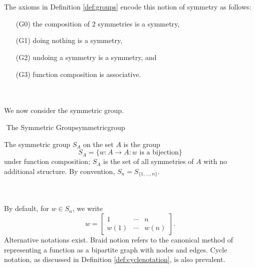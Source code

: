     \pagebreak
    \vphantom
    \\
    \\
    The axioms in Definition \ref{def:groups} encode this notion of symmetry as follows:
    \begin{enumerate}
        \item[(G0)] the composition of \(2\) symmetries is a symmetry,
        \item[(G1)] doing nothing is a symmetry,
        \item[(G2)] undoing a symmetry is a symmetry, and
        \item[(G3)] function composition is associative. 
    \end{enumerate}
    \vphantom
    \\
    \\
    We now consider the symmetric group.
    \begin{definition}{\Stop\,\,The Symmetric Group}{symmetricgroup}

        The symmetric group \(S_A\) on the set \(A\) is the group 
        \begin{equation*}
            S_A=\{w:A\to A:w\text{ is a bijection}\}
        \end{equation*}
        under function composition; \(S_A\) is the set of all symmetries of \(A\) with no additional structure. By convention, \(S_n=S_{\{1,\ldots,n\}}\).
        
    \end{definition}
    \vphantom
    \\
    \\
    By default, for \(w\in S_n\), we write
    \begin{equation*}
        w=\begin{bmatrix}
            1 & \cdots & n \\
            w(1) & \cdots & w(n)
        \end{bmatrix}.
    \end{equation*}
    Alternative notations exist. Braid notion refers to the canonical method of representing a function as a bipartite graph with nodes and edges. Cycle notation, as discussed in Definition \ref{def:cyclenotation}, is also prevalent.
